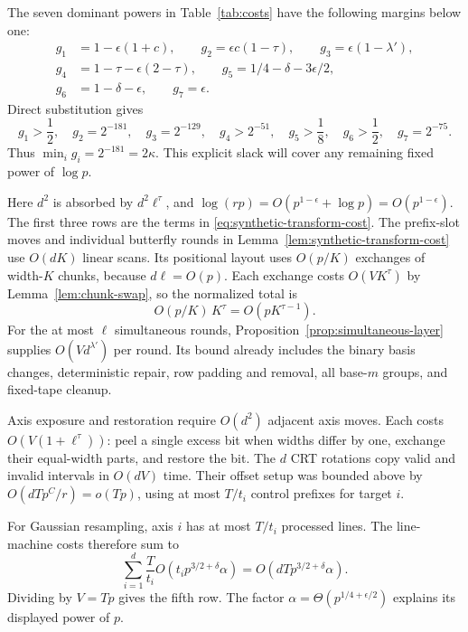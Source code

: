 The seven dominant powers in Table~\ref{tab:costs} have the following
margins below one:
\begin{equation}\label{eq:margin-list}
\begin{split}
 g_1&=1-\epsilon(1+c),\qquad
 g_2=\epsilon c(1-\tau),\qquad
 g_3=\epsilon(1-\lambda'),\\
 g_4&=1-\tau-\epsilon(2-\tau),\qquad
 g_5=1/4-\delta-3\epsilon/2,\\
 g_6&=1-\delta-\epsilon,\qquad g_7=\epsilon.
\end{split}
\end{equation}
Direct substitution gives
\[
 g_1>\frac12,\quad g_2=2^{-181},\quad g_3=2^{-129},\quad
 g_4>2^{-51},\quad g_5>\frac18,\quad g_6>\frac12,\quad g_7=2^{-75}.
\]
Thus $\min_i g_i=2^{-181}=2\kappa$.  This explicit slack will cover
any remaining fixed power of $\log p$.

Here $d^2$ is absorbed by $d^2\ell^\tau$, and
$\log(rp)=O(p^{1-\epsilon}+\log p)=O(p^{1-\epsilon})$.
The first three rows are the terms in
\eqref{eq:synthetic-transform-cost}. The prefix-slot moves and
individual butterfly rounds in Lemma~\ref{lem:synthetic-transform-cost}
use $O(dK)$ linear scans. Its positional layout uses $O(p/K)$ exchanges
of width-$K$ chunks, because $d\ell=O(p)$. Each exchange costs
$O(VK^\tau)$ by Lemma~\ref{lem:chunk-swap}, so the normalized total is
\[
 O(p/K)\,K^\tau=O(pK^{\tau-1}).
\]
For the at most $\ell$ simultaneous rounds,
Proposition~\ref{prop:simultaneous-layer} supplies $O(Vd^{\lambda'})$
per round. Its bound already includes the binary basis changes,
deterministic repair, row padding and removal, all base-$m$ groups,
and fixed-tape cleanup.

Axis exposure and restoration require $O(d^2)$ adjacent axis moves.
Each costs $O(V(1+\ell^\tau))$: peel a single excess bit when widths
differ by one, exchange their equal-width parts, and restore the bit.
The $d$ CRT rotations copy valid and invalid intervals in $O(dV)$ time.
Their offset setup was bounded above by $O(dTp^C/r)=o(Tp)$,
using at most $T/t_i$ control prefixes for target $i$.

For Gaussian resampling, axis $i$ has at most $T/t_i$ processed lines.
The line-machine costs therefore sum to
\[
 \sum_{i=1}^d\frac{T}{t_i}
       O(t_i p^{3/2+\delta}\alpha)
 =O(dTp^{3/2+\delta}\alpha).
\]
Dividing by $V=Tp$ gives the fifth row.  The factor
$\alpha=\Theta(p^{1/4+\epsilon/2})$ explains its displayed power of $p$.

